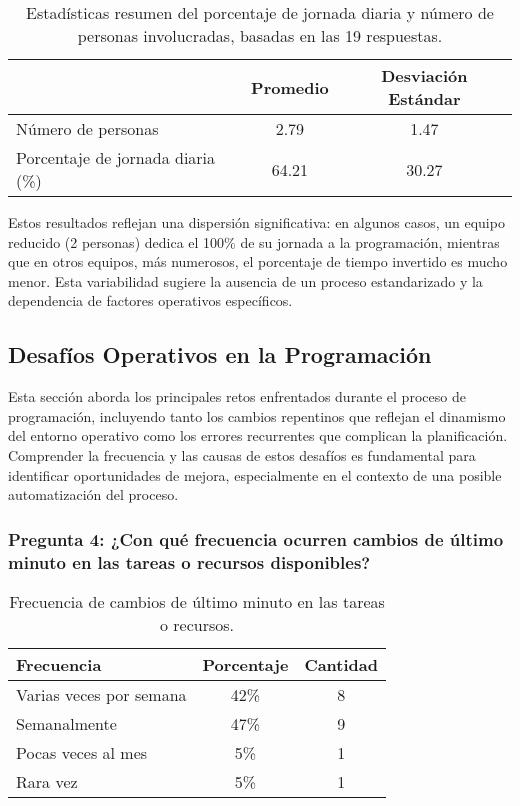 \documentclass{article}
\begin{document}
\begin{table}[H]
    \centering
    \begin{tabular}{lcc}
        \toprule
        & \textbf{Promedio} & \textbf{Desviación Estándar} \\
        \midrule
        Número de personas & 2.79 & 1.47 \\
        Porcentaje de jornada diaria (\%) & 64.21 & 30.27 \\
        \bottomrule
    \end{tabular}
    \caption{Estadísticas resumen del porcentaje de jornada diaria y número de personas involucradas, basadas en las 19 respuestas.}
    \label{tab:estadisticas_resumen_jornada}
\end{table}

Estos resultados reflejan una dispersión significativa: en algunos casos, un equipo reducido (2 personas) dedica el 100\% de su jornada a la programación, mientras que en otros equipos, más numerosos, el porcentaje de tiempo invertido es mucho menor. Esta variabilidad sugiere la ausencia de un proceso estandarizado y la dependencia de factores operativos específicos.

\subsection*{Desafíos Operativos en la Programación}


Esta sección aborda los principales retos enfrentados durante el proceso de programación, incluyendo tanto los cambios repentinos que reflejan el dinamismo del entorno operativo como los errores recurrentes que complican la planificación. Comprender la frecuencia y las causas de estos desafíos es fundamental para identificar oportunidades de mejora, especialmente en el contexto de una posible automatización del proceso.

\subsubsection*{Pregunta 4: ¿Con qué frecuencia ocurren cambios de último minuto en las tareas o recursos disponibles?}

\begin{table}[H]
    \centering
    \begin{tabular}{lcc}
        \toprule
        \textbf{Frecuencia} & \textbf{Porcentaje} & \textbf{Cantidad} \\
        \midrule
        Varias veces por semana & 42\% & 8 \\
        Semanalmente & 47\% & 9 \\
        Pocas veces al mes & 5\% & 1 \\
        Rara vez & 5\% & 1 \\
        \bottomrule
    \end{tabular}
    \caption{Frecuencia de cambios de último minuto en las tareas o recursos.}
    \label{tab:cambios_ultimo_minuto}
\end{table}
\end{document}

